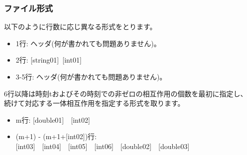 \subsubsection{ファイル形式}
以下のように行数に応じ異なる形式をとります。
 \begin{itemize}
   \item  1行:  ヘッダ(何が書かれても問題ありません)。
   \item  2行:   [string01]~[int01]
   \item  3-5行:  ヘッダ(何が書かれても問題ありません)。
  \end{itemize}
6行以降は時刻tおよびその時刻での非ゼロの相互作用の個数を最初に指定し、
続けて対応する一体相互作用を指定する形式を取ります。
 \begin{itemize}
    \item  m行: [double01]~~[int02]
    \item  (m+1) - (m+1+[int02])行: [int03]~~[int04]~~[int05]~~[int06]~~[double02]~~[double03]
 \end{itemize}
   

